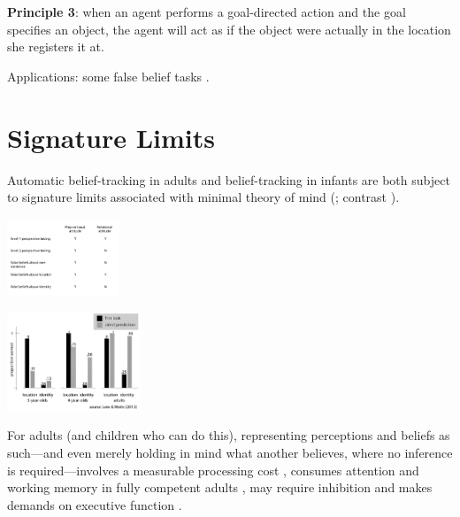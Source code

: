 \documentclass[12pt]{extarticle}
\begin{document}
\begin{multicols*}{3}
\textbf{Principle 3}: when an agent performs a goal-directed action and the goal specifies an object, the agent will act as if the object were actually in the location she registers it at.

Applications: some false belief tasks \citep{Onishi:2005hm,Southgate:2007js,Buttelmann:2009gy}.



\section{Signature Limits}

Automatic belief-tracking in adults and
belief-tracking in infants are both subject to signature limits
associated with minimal theory of mind
(\citealp{wang:2015_limits,Low:2012_identity,low:2014_quack,mozuraitis:2015_privileged};
contrast \citealp{scott:2015_infants}).

\begin{center}

\includegraphics[width=0.25\textwidth]{fig/signature_limits_table.png}

\end{center}

\begin{center}

\includegraphics[width=0.3\textwidth]{fig/low_2012_fig.png}

\end{center}

For adults (and children who can do this),
representing perceptions and beliefs as such---and even merely holding in mind
what another believes, where no inference is required---involves a measurable
processing cost \citep{apperly:2008_back,apperly:2010_limits}, consumes attention
and working memory in fully competent adults \citealp{Apperly:2009cc,
lin:2010_reflexively, McKinnon:2007rr},  may require inhibition \citep{bull:2008_role}
and makes demands on executive function \citep{apperly:2004_frontal,samson:2005_seeing}.


\end{multicols*}
\end{document}
